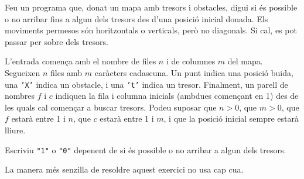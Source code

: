 

\Statement

Feu un programa que, donat un mapa amb tresors i obstacles,
digui si és possible o no arribar fins a algun dels tresors
des d'una posició inicial donada.
Els moviments permesos són horitzontals o verticals,
però no diagonals.
Si cal, es pot passar per sobre dels tresors.


\Input

L'entrada comença amb el nombre de files $n$ i de columnes $m$ del mapa.
Segueixen $n$ files amb $m$ caràcters cadascuna.
Un punt indica una posició buida,
una \texttt{'X'} indica un obstacle,
i una \texttt{'t'} indica un tresor.
Finalment, un parell de nombres $f$ i $c$
indiquen la fila i columna inicials (ambdues començant en 1)
des de les quals cal començar a buscar tresors.
Podeu suposar que $n > 0$, que $m > 0$,
que $f$ estarà entre 1 i $n$, que $c$ estarà entre 1 i $m$,
i que la posició inicial sempre estarà lliure.


\Output

Escriviu \texttt{"1"} o \texttt{"0"}
depenent de si és possible o no arribar a algun dels tresors.


\Observation

La manera més senzilla de resoldre aquest exercici no usa cap cua.


\SampleTwoCol
